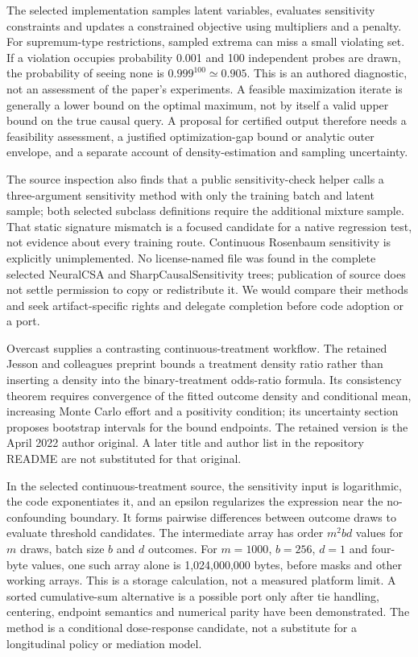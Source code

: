 The selected implementation samples latent variables, evaluates sensitivity constraints and updates a constrained objective using multipliers and a penalty. For supremum-type restrictions, sampled extrema can miss a small violating set. If a violation occupies probability 0.001 and 100 independent probes are drawn, the probability of seeing none is $0.999^{100}\simeq0.905$. This is an authored diagnostic, not an assessment of the paper's experiments. A feasible maximization iterate is generally a lower bound on the optimal maximum, not by itself a valid upper bound on the true causal query. A proposal for certified output therefore needs a feasibility assessment, a justified optimization-gap bound or analytic outer envelope, and a separate account of density-estimation and sampling uncertainty.\cite{exec25_pymed_neuralcsa,exec25_pymed_neural_paper,exec25_pymed_choice}

The source inspection also finds that a public sensitivity-check helper calls a three-argument sensitivity method with only the training batch and latent sample; both selected subclass definitions require the additional mixture sample. That static signature mismatch is a focused candidate for a native regression test, not evidence about every training route. Continuous Rosenbaum sensitivity is explicitly unimplemented. No license-named file was found in the complete selected NeuralCSA and SharpCausalSensitivity trees; publication of source does not settle permission to copy or redistribute it. We would compare their methods and seek artifact-specific rights and delegate completion before code adoption or a port.\cite{exec25_pymed_neuralcsa,exec25_pymed_sharp,exec25_pymed_choice}

Overcast supplies a contrasting continuous-treatment workflow. The retained Jesson and colleagues preprint bounds a treatment density ratio rather than inserting a density into the binary-treatment odds-ratio formula. Its consistency theorem requires convergence of the fitted outcome density and conditional mean, increasing Monte Carlo effort and a positivity condition; its uncertainty section proposes bootstrap intervals for the bound endpoints. The retained version is the April 2022 author original. A later title and author list in the repository README are not substituted for that original.\cite{exec25_pymed_overcast_paper,exec25_pymed_overcast}

In the selected continuous-treatment source, the sensitivity input is logarithmic, the code exponentiates it, and an epsilon regularizes the expression near the no-confounding boundary. It forms pairwise differences between outcome draws to evaluate threshold candidates. The intermediate array has order $m^2bd$ values for $m$ draws, batch size $b$ and $d$ outcomes. For $m=1000$, $b=256$, $d=1$ and four-byte values, one such array alone is 1,024,000,000 bytes, before masks and other working arrays. This is a storage calculation, not a measured platform limit. A sorted cumulative-sum alternative is a possible port only after tie handling, centering, endpoint semantics and numerical parity have been demonstrated. The method is a conditional dose-response candidate, not a substitute for a longitudinal policy or mediation model.\cite{exec25_pymed_overcast,exec25_pymed_choice}

